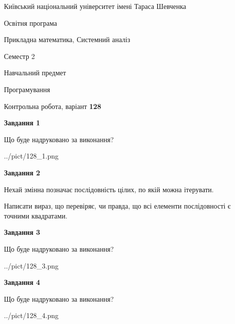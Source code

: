 \documentclass[12pt, ukrainian]{article}
\begin{document}
{{\begin {small}\par
{ \center  Київський національний університет імені Тараса Шевченка \par}
{\parbox {5 cm}{Освітня програма \hfill}{\parbox {8 cm}{Прикладна математика, Системний аналіз \hfill}}\parbox {5 cm}{\hfill Семестр 2}}\par
{\parbox {5 cm} {Навчальний предмет \hfill}\parbox {7 cm}{Програмування \hfill}\parbox {6cm}{\hfill}\par}\vspace{-7pt} \end{small}}{\center Контрольна робота, варіант  \No \textbf
{ 128 }\par}}
{
\begin {large}
{\begin {center}\textbf{Завдання 1}\end {center}}\par
Що буде надруковано за виконання?\par\par
\begin{center}
	{../pict/128_1.png}
\end{center}
\newpage

{\begin {center}\textbf{Завдання 2}\end {center}}\par
Нехай змінна  позначає послідовність цілих, по якій можна ітерувати.

Написати вираз, що перевіряє, чи правда, що всі елементи послідовності є точними квадратами.\par
\newpage

{\begin {center}\textbf{Завдання 3}\end {center}}\par
Що буде надруковано за виконання?
\begin{center}
	{../pict/128_3.png}
\end{center}
\newpage

{\begin {center}\textbf{Завдання 4}\end {center}}\par
Що буде надруковано за виконання?\par
\begin{center}
	{../pict/128_4.png}
\end{center}
\newpage


\end{large}}
\end{document}
